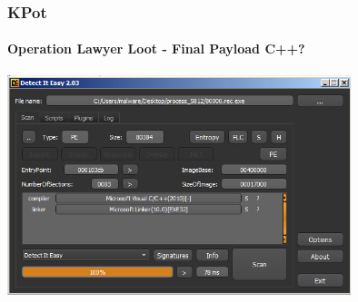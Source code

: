 \documentclass[aspectratio=169]{beamer}
\begin{document}
{
\begin{frame}
  \frametitle{KPot}
  \framesubtitle{Operation Lawyer Loot - Final Payload C++?}
  \begin{center}
    \includegraphics[width=10cm]{kpot-unpacking-13}
  \end{center}
\end{frame}
}
\end{document}
